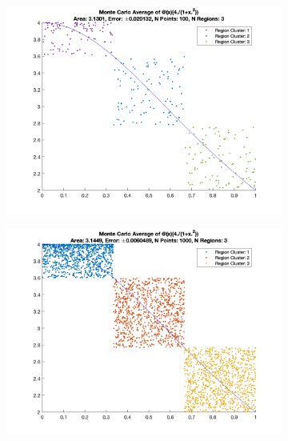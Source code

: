 \documentclass[12pt]{article}
\begin{document}
\begin{figure}[htp]
\centering

\begin{subfigure}{0.49\columnwidth}
\centering
\includegraphics[width=\textwidth]{problem_1_n_100.png}
\caption{}
\label{fig:time1}
\end{subfigure}\hfill
\begin{subfigure}{0.49\columnwidth}
\centering
\includegraphics[width=\textwidth]{problem_1_n_1000.png}
\caption{}
\label{fig:time2}
\end{subfigure}

\medskip


\end{figure}
\end{document}
